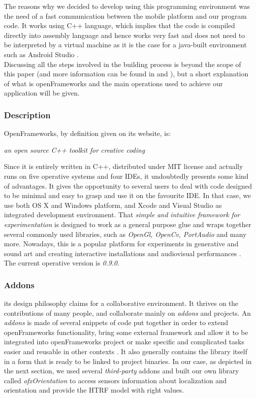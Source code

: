 \documentclass[journal]{IEEEtran}
\begin{document}
The reasons why we decided to develop using this programming environment was the need of a fast communication between the mobile platform and our program code. It works using C++ language, which implies that the code is compiled directly into assembly language and hence works very fast \cite{} and does not need to be interpreted by a virtual machine as it is the case for a java-built environment such as Android Studio \cite{}. \\
Discussing all the steps involved in the building process is beyond the scope of this paper (and more information can be found in \cite{} and \cite{}), but a short explanation of what is openFrameworks and the main operations used to achieve our application will be given. \\
\subsubsection{Description}
OpenFrameworks, by definition given on its website, is:
\begin{center}
{\footnotesize{\textit{an open source C++ toolkit for creative coding}}\cite{}}
\end{center}
Since it is entirely written in C++, distributed under MIT license and actually runs on five operative systems and four IDEs, it undoubtedly presents some kind of advantages. It gives the opportunity to several users to deal with code designed to be minimal and easy to grasp and use it on the favourite IDE. In that case, we use both OS X and Windows platform, and Xcode and Visual Studio as integrated development environment. That \textit{simple and intuitive framework for experimentation} \cite{} is designed to work as a general purpose glue and wraps together several commonly used libraries, such as \emph{OpenGl, OpenCv, PortAudio} and many more. Nowadays, this is a popular platform for experiments in generative and sound art and creating interactive installations and audiovisual performances \cite{}. The current operative version is \emph{0.9.0}.

\subsubsection{Addons}
its design philosophy claims for a collaborative environment. It thrives on the contributions of many people, and collaborate mainly on \emph{addons} and projects. An \emph{addons} is made of several snippets of code put together in order to extend openFrameworks functionality, bring some external framework and allow it to be integrated into openFrameworks project or make specific and complicated tasks easier and reusable in other contexts \cite{}. It also generally contains the library itself in a form that is ready to be linked to project binaries. In our case, as depicted in the next section, we used several \textit{third-party} addons and built our own library called \emph{ofxOrientation} to access sensors information about localization and orientation and provide the HTRF model with right values. 
\end{document}
